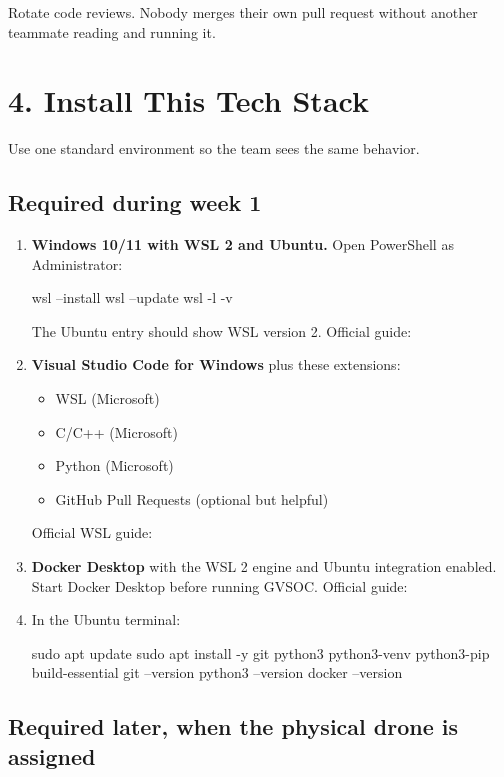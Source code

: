 \documentclass[11pt]{article}
\begin{document}
Rotate code reviews. Nobody merges their own pull request without another teammate reading and running it.

\section{4. Install This Tech Stack}

Use one standard environment so the team sees the same behavior.

\subsection{Required during week 1}

\begin{enumerate}
\item \textbf{Windows 10/11 with WSL 2 and Ubuntu.} Open PowerShell as Administrator:
\begin{Code}
wsl --install
wsl --update
wsl -l -v
\end{Code}
The Ubuntu entry should show WSL version 2. Official guide:

\item \textbf{Visual Studio Code for Windows} plus these extensions:
  \begin{itemize}
  \item WSL (Microsoft)
  \item C/C++ (Microsoft)
  \item Python (Microsoft)
  \item GitHub Pull Requests (optional but helpful)
  \end{itemize}
Official WSL guide: 

\item \textbf{Docker Desktop} with the WSL 2 engine and Ubuntu integration enabled. Start Docker Desktop before running GVSOC. Official guide:

\item In the Ubuntu terminal:
\begin{Code}
sudo apt update
sudo apt install -y git python3 python3-venv python3-pip build-essential
git --version
python3 --version
docker --version
\end{Code}
\end{enumerate}

\subsection{Required later, when the physical drone is assigned}
\end{document}
